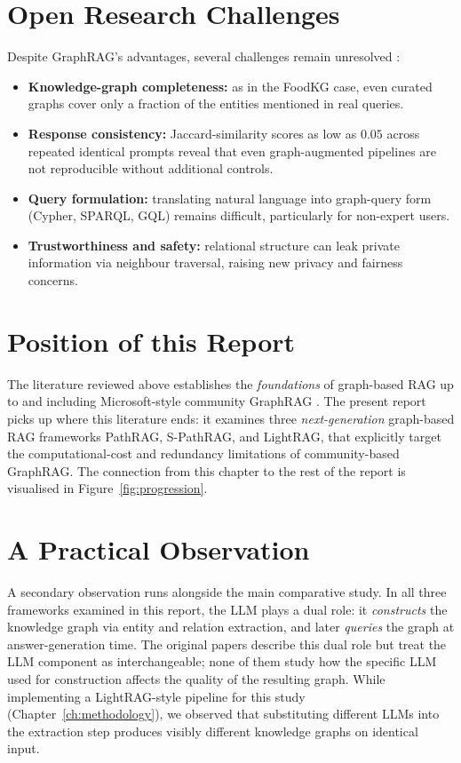 \documentclass[12pt,a4paper,oneside]{report}
\begin{document}
\section{Open Research Challenges}
\label{sec:lit_open_challenges}

Despite GraphRAG's advantages, several challenges remain unresolved
\citep{han2025,erickson2025}:
\begin{itemize}[leftmargin=2em,itemsep=2pt]
    \item \textbf{Knowledge-graph completeness:} as in the FoodKG case, even
          curated graphs cover only a fraction of the entities mentioned in
          real queries.
    \item \textbf{Response consistency:} Jaccard-similarity scores as low as
          $0.05$ across repeated identical prompts reveal that even
          graph-augmented pipelines are not reproducible without additional
          controls.
    \item \textbf{Query formulation:} translating natural language into
          graph-query form (Cypher, SPARQL, GQL) remains difficult,
          particularly for non-expert users.
    \item \textbf{Trustworthiness and safety:} relational structure can leak
          private information via neighbour traversal, raising new privacy
          and fairness concerns.
\end{itemize}

\section{Position of this Report}
\label{sec:lit_position}

The literature reviewed above establishes the \emph{foundations} of
graph-based RAG up to and including Microsoft-style community GraphRAG
\citep{edge2024,han2025}. The present report picks up where this literature
ends: it examines three \emph{next-generation} graph-based RAG frameworks
PathRAG, S-PathRAG, and LightRAG, that explicitly target the
computational-cost and redundancy limitations of community-based GraphRAG.
The connection from this chapter to the rest of the report is visualised in
Figure~\ref{fig:progression}.

\section{A Practical Observation}
\label{sec:practical_observation}

A secondary observation runs alongside the main comparative study. In all
three frameworks examined in this report, the LLM plays a dual role: it
\emph{constructs} the knowledge graph via entity and relation extraction,
and later \emph{queries} the graph at answer-generation time. The original
papers describe this dual role but treat the LLM component as
interchangeable; none of them study how the specific LLM used for
construction affects the quality of the resulting graph. While
implementing a LightRAG-style pipeline for this study
(Chapter~\ref{ch:methodology}), we observed that substituting different
LLMs into the extraction step produces visibly different knowledge graphs
on identical input.
\end{document}
